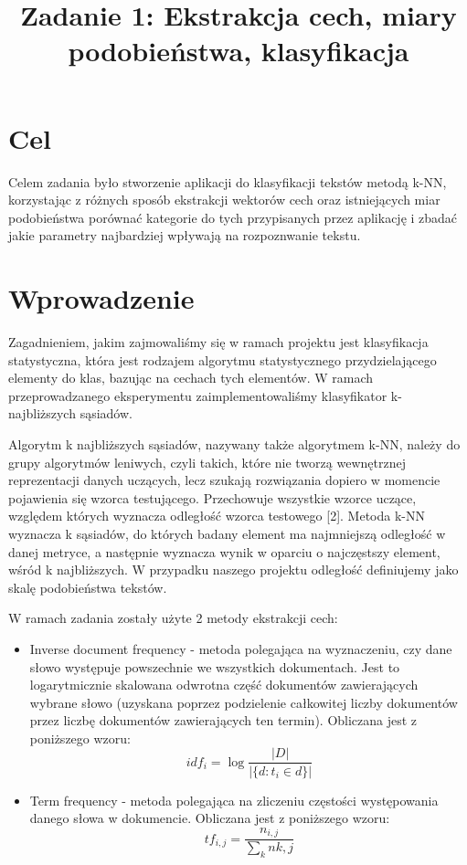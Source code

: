 \documentclass{classrep}
\author{
  \studentinfo{Piotr Traczyk}{123123} \and
  \studentinfo{Bartosz Jurczewski}{210209}
}
\title{Zadanie 1: Ekstrakcja cech, miary podobieństwa, klasyfikacja}
\begin{document}
\maketitle


\section{Cel}
Celem zadania było stworzenie aplikacji do klasyfikacji tekstów metodą k-NN, korzystając z różnych sposób ekstrakcji wektorów cech oraz istniejących miar podobieństwa porównać kategorie do tych przypisanych przez aplikację i zbadać jakie parametry najbardziej wpływają na rozpoznwanie tekstu.

\section{Wprowadzenie}
Zagadnieniem, jakim zajmowaliśmy się w ramach projektu jest klasyfikacja statystyczna, która jest rodzajem algorytmu statystycznego przydzielającego elementy do klas, bazując na cechach tych elementów. W ramach przeprowadzanego eksperymentu zaimplementowaliśmy klasyfikator k-najbliższych sąsiadów. \newline

Algorytm k najbliższych sąsiadów, nazywany także algorytmem k-NN, należy do grupy algorytmów leniwych, czyli takich, które nie tworzą wewnętrznej reprezentacji danych uczących, lecz szukają rozwiązania dopiero w momencie pojawienia się wzorca testującego. Przechowuje wszystkie wzorce uczące, względem których wyznacza odległość wzorca testowego [2]. Metoda k-NN wyznacza k sąsiadów, do których badany element ma najmniejszą odległość w danej metryce, a następnie wyznacza wynik w oparciu o najczęstszy element, wśród k najbliższych. W przypadku naszego projektu odległość definiujemy jako skalę podobieństwa tekstów. \newline

W ramach zadania zostały użyte 2 metody ekstrakcji cech: \newline
\begin{itemize}

\item Inverse document frequency - metoda polegająca na wyznaczeniu, czy dane słowo występuje powszechnie we wszystkich dokumentach. Jest to logarytmicznie skalowana odwrotna część dokumentów zawierających wybrane słowo (uzyskana poprzez podzielenie całkowitej liczby dokumentów przez liczbę dokumentów zawierających ten termin). Obliczana jest z poniższego wzoru:
$$
idf_{i}
= \log\frac{|D|}{|\{d : t_{i} \in d\}|}
$$

\item Term frequency - metoda polegająca na zliczeniu częstości występowania danego słowa w dokumencie. Obliczana jest z poniższego wzoru:
$$
tf_{i,j}
= \frac{n_{i,j}}{\sum_{k}n{k,j}}
$$
\end{itemize}
\end{document}
